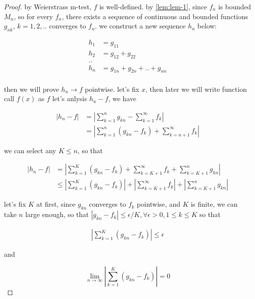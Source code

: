 \documentclass[11pt,a4paper]{article}
\begin{document}
\begin{proof}
    by Weierstrass m-test, $f$ is well-defined.
    by \autoref{lem:lem-1}, since $f_n$ is bounded $M_n$, so for every $f_n$, there exists a sequence of continuous and bounded functions $g_{nk},\, k=1,2,..$ 
    converges to $f_n$. we construct a new sequence $h_n$ below:

    \begin{align*}
        h_1 &= g_{11} \\
        h_2 &= g_{12} + g_{22} \\
        .. \\
        h_n &= g_{1n} + g_{2n} + .. + g_{nn} \\
    \end{align*}

    then we will prove $h_n \to f$ pointwise. let's fix $x$, then later we will write function call $f(x)$ as $f$
    let's anlysis $h_n - f$, we have

    \begin{align*}
        \lvert h_n - f \rvert &= \left| \sum_{k=1}^{n}g_{kn} - \sum_{k=1}^{\infty}f_k \right| \\
        &= \left| \sum_{k=1}^{n}\left( g_{kn} - f_k\right) + \sum_{k=n+1}^{\infty}f_k \right|
    \end{align*}

    we can select any $K \le n$, so that

    \begin{align*}
        \lvert h_n - f \rvert &= \left| \sum_{k=1}^{K}\left( g_{kn} - f_k\right) + \sum_{k=K+1}^{\infty}f_k + \sum_{k=K+1}^{n}g_{kn} \right| \\
         & \le \left| \sum_{k=1}^{K}\left( g_{kn} - f_k\right) \right| + \left|\sum_{k=K+1}^{\infty}f_k\right| + \left|\sum_{k=K+1}^{n}g_{kn} \right|
    \end{align*}

    let's fix $K$ at first, since $g_{kn}$ converges to $f_k$ pointwise, and $K$ is finite, we can take $n$ large enough, so that $|g_{kn} - f_k| \le \epsilon/K, \forall \epsilon > 0, 1 \le k \le K$
    so that 

    \begin{align*}
        \left| \sum_{k=1}^{K}\left( g_{kn} - f_k\right) \right| \le \epsilon 
    \end{align*}

    and 

    \[
        \lim_{n \to \infty}\left| \sum_{k=1}^{K}\left( g_{kn} - f_k\right) \right| = 0
    \]


\end{proof}
\end{document}
